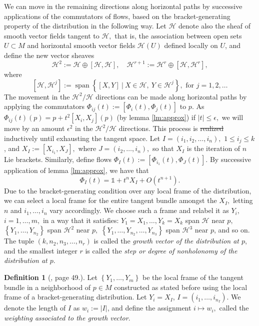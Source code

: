 \documentclass[12pt, letterpaper, reqno]{amsart}
\theoremstyle{definition}
\newtheorem{df}{Definition}
\theoremstyle{plain}
\theoremstyle{remark}
\providecommand{\DIFadd}[1]{{\protect\color{blue}\uwave{#1}}} %
\providecommand{\DIFdel}[1]{{\protect\color{red}\sout{#1}}}                      %
\providecommand{\DIFaddbegin}{} %
\providecommand{\DIFaddend}{} %
\providecommand{\DIFdelbegin}{} %
\providecommand{\DIFdelend}{} %
\newcommand{\DIFscaledelfig}{0.5}
\newlength{\DIFdelgraphicswidth} %
\newlength{\DIFdelgraphicsheight} %
\newcommand{\DIFaddincludegraphics}[2][]{{\color{blue}\fbox{\DIFOincludegraphics[#1]{#2}}}} %
\newcommand{\DIFdelincludegraphics}[2][]{%
\sbox{\DIFdelgraphicsbox}{\DIFOincludegraphics[#1]{#2}}%
\settoboxwidth{\DIFdelgraphicswidth}{\DIFdelgraphicsbox} %
\settoboxtotalheight{\DIFdelgraphicsheight}{\DIFdelgraphicsbox} %
\scalebox{\DIFscaledelfig}{%
\parbox[b]{\DIFdelgraphicswidth}{\usebox{\DIFdelgraphicsbox}\\[-\baselineskip] \rule{\DIFdelgraphicswidth}{0em}}\llap{\resizebox{\DIFdelgraphicswidth}{\DIFdelgraphicsheight}{%
\setlength{\unitlength}{\DIFdelgraphicswidth}%
\begin{picture}(1,1)%
\thicklines\linethickness{2pt} %
{\color[rgb]{1,0,0}\put(0,0){\framebox(1,1){}}}%
{\color[rgb]{1,0,0}\put(0,0){\line( 1,1){1}}}%
{\color[rgb]{1,0,0}\put(0,1){\line(1,-1){1}}}%
\end{picture}%
}\hspace*{3pt}}} %
} %
\DeclareRobustCommand{\DIFaddbegin}{\DIFOaddbegin \let\includegraphics\DIFaddincludegraphics} %
\DeclareRobustCommand{\DIFaddend}{\DIFOaddend \let\includegraphics\DIFOincludegraphics} %
\DeclareRobustCommand{\DIFdelbegin}{\DIFOdelbegin \let\includegraphics\DIFdelincludegraphics} %
\DeclareRobustCommand{\DIFdelend}{\DIFOaddend \let\includegraphics\DIFOincludegraphics} %
\begin{document}
We can move in the remaining directions along horizontal paths by successive applications of the commutators of flows, based on the bracket-generating property of the distribution in the following way. Let $ \mathcal{H} $ denote also the sheaf of smooth vector fields tangent to $ \mathcal{H}, $ that is, the association between open sets $ U\subset M $ and horizontal smooth vector fields $ \mathcal{H}(U) $ defined locally on $ U $, and define the new vector sheaves
$$ \mathcal{H}^2 := \mathcal{H}\oplus [\mathcal{H},\mathcal{H}],\quad \mathcal{H}^{r+1} := \mathcal{H}^r\oplus [\mathcal{H}, \mathcal{H}^r], $$
where
$$ \left[ \mathcal{H}, \mathcal{H}^j \right]:= \operatorname{span} \left\{ [X,Y] \ | \ X\in \mathcal{H},\ Y \in \mathcal{H}^j \right\}, \text{ for }j=1,2,\dots  $$ 
The movement in the $ \mathcal{H}^2/\mathcal{H} $ directions can be made along horizontal paths by applying the commutators $ \Phi_{ij}(t):= [\Phi_i(t),\Phi_j(t)] $ to $ p. $ As $ \Phi_{ij}(t)(p)=p+t^2[X_i, X_j](p) $ (by lemma \ref{lm:approx}) if $ |t|\leq\epsilon, $ we will move by an amount $ \epsilon^2 $ in the $ \mathcal{H}^2/\mathcal{H} $ directions. This process is \DIFdelbegin \DIFdel{realized }\DIFdelend \DIFaddbegin \DIFadd{done }\DIFaddend inductively until exhausting the \DIFaddbegin \DIFadd{entire }\DIFaddend tangent space. Let $ I=(i_1,i_2,\dots,i_n), $ $ 1\leq i_j\leq k $, and $ X_I:=[X_{i_1}, X_J], $ where $ J=(i_2,\dots,i_n), $  so that $ X_I $ is the iteration of $ n $ Lie brackets. Similarly, define flows $ \Phi_I(t):=[\Phi_{i_1}(t), \Phi_J(t)] $. By successive application of lemma \ref{lm:approx}, we have that   
$$ \Phi_I(t)= \mathbb{1} +t^n X_I+ O(t^{n+1}).$$ 
Due to the bracket-generating condition over any local frame of the distribution, we can select a local frame for the entire tangent bundle amongst the $ X_I, $ letting $ n $ and $ i_1,\dots,i_n $ vary accordingly. We choose such a frame and relabel it as $ Y_i, $ $ i=1,\dots,m, $ in a way that it satisfies: $ Y_1=X_1,\dots, Y_k=X_k $ span $ \mathcal{H} $ near $ p, $ $ \left\{ Y_1,\dots,Y_{n_2} \right\} $ span $ \mathcal{H}^2 $ near $ p, $ $ \left\{ Y_1,\dots,Y_{n_2},\dots,Y_{n_3} \right\} $ span $ \mathcal{H}^3 $ near $ p $,  and so on. The tuple $ (k,n_2,n_3,\dots, n_r) $ is called the \textit{growth vector of the distribution at $ p $}, and the smallest integer $ r $ is called the \textit{step or degree of nonholonomy of the distribution at $ p. $ }   

\begin{df}[\cite{montgomery2002tour}, page 49.] Let $ \left\{ Y_1,\dots, Y_m \right\} $ be the local frame of the tangent bundle in a neighborhood of $ p\in M $ constructed as stated before using the local frame of a bracket-generating distribution. Let $ Y_i=X_I $, $ I=(i_1,\dots,i_{n_I}) $. We denote the length of $ I $ as $ w_i:= \left| I \right| $, and define the assignment $ i\mapsto w_i, $ called the \textit{weighting associated to the growth vector}. 

\end{df}
\end{document}
